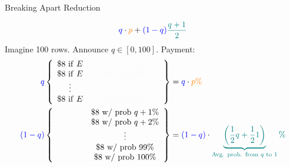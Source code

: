 \begin{frame}{Breaking Apart Reduction}
    \begin{center}
        $${\color{blue}q}\cdot {\color{orange}p} + {\color{blue}(1-q)}\color{blue!50!green}\frac{q+1}{2}$$
        Imagine 100 rows. Announce $q\in[0,100]$. Payment:\\
        \begin{align*}
        {\color{blue}q}\left \{\begin{array}{cc}
        \mathrm{\$8\ if\ }E & {\color{black!2}\mathrm{\$8\ w/\ prob\ }q+1\mathrm{\%}}\\
        \mathrm{\$8\ if\ }E & {\color{black!2}\mathrm{\$8 w/ prob 10\%}}\\
        \vdots & \\
        \mathrm{\$8\ if\ }E & {\color{black!2}\mathrm{\$8 w/ prob 10\%}}\\
        \end{array}
        \right\}&={\color{blue}q}\cdot{\color{orange}p\%} \\
        {\color{blue}(1-q)}\left \{\begin{array}{cc}
        {\color{black!2}\mathrm{\$8\ if\ }E} & \mathrm{\$8\ w/\ prob\ }q+1\mathrm{\%}\\
         & \mathrm{\$8\ w/\ prob\ }q+2\mathrm{\%}\\
         & \vdots \\
         & \mathrm{\$8\ w/\ prob\ 99\%}\\
         & \mathrm{\$8\ w/\ prob\ 100\%}\\
        \end{array}
        \right\}&={\color{blue}(1-q)}\cdot{\color{blue!50!green}\underbrace{\left(\frac{1}{2}q+\frac{1}{2}1\right)}_{\text{Avg. prob. from $q$ to $1$}}\%}
        \end{align*}
    \end{center}
\end{frame}

